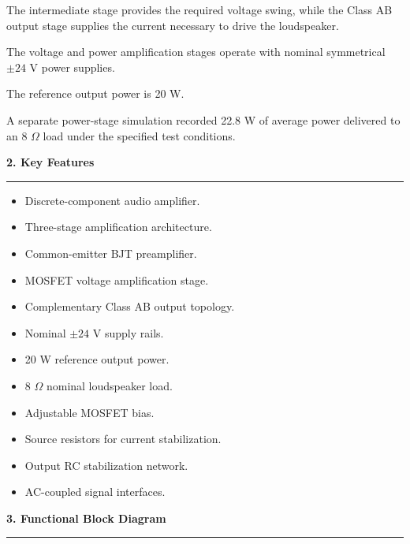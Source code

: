\documentclass[10pt,letterpaper]{article}
\newcommand{\datasheetsection}[1]{
    \vspace{0.3cm}
    {\large\bfseries\color{datasheetblue}#1}
    \par\vspace{0.1cm}
    \hrule
    \vspace{0.15cm}
}
\begin{document}
The intermediate stage provides the required
voltage swing, while the Class AB output stage
supplies the current necessary to drive the
loudspeaker.

The voltage and power amplification stages
operate with nominal symmetrical
$\pm24$ V power supplies.

The reference output power is 20 W.

A separate power-stage simulation recorded
22.8 W of average power delivered to an
8 $\Omega$ load under the specified test conditions.

\datasheetsection{2. Key Features}

\begin{itemize}

\item Discrete-component audio amplifier.

\item Three-stage amplification architecture.

\item Common-emitter BJT preamplifier.

\item MOSFET voltage amplification stage.

\item Complementary Class AB output topology.

\item Nominal $\pm24$ V supply rails.

\item 20 W reference output power.

\item 8 $\Omega$ nominal loudspeaker load.

\item Adjustable MOSFET bias.

\item Source resistors for current stabilization.

\item Output RC stabilization network.

\item AC-coupled signal interfaces.

\end{itemize}

\datasheetsection{3. Functional Block Diagram}
\end{document}
